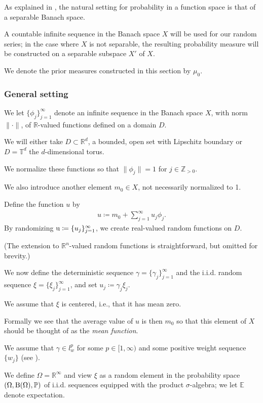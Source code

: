 \documentclass[oneside]{article}
\numberwithin{equation}{section}
\begin{document}
As explained in \cite[Sect. A.2.2]{Dashti_Stuart2017}, the natural setting for probability in a function space is that of a separable Banach space.

A countable infinite sequence in the Banach space $X$ will be used for our random series; in the case where $X$ is not separable, the resulting probability measure will be constructed on a separable subspace $X'$ of $X$.

We denote the prior measures constructed in this section by $\mu_0$.

\subsubsection{General setting}
We let $\{\phi_j\}_{j=1}^\infty$ denote an infinite sequence in the Banach space $X$, with norm $\|\cdot\|$, of $\mathbb{R}$-valued functions defined on a domain $D$.

We will either take $D\subset\mathbb{R}^d$, a bounded, open set with Lipschitz boundary or $D = \mathbb{T}^d$ the $d$-dimensional torus.

We normalize these functions so that $\|\phi_j\| = 1$ for $j\in\mathbb{Z}_{> 0}$.

We also introduce another element $m_0\in X$, not necessarily normalized to 1.

Define the function $u$ by
\begin{align}
    \label{random function}
    \tag{rand-func}
    u\coloneqq m_0 + \sum_{j=1}^\infty u_j\phi_j.
\end{align}
By randomizing ${\rm u}\coloneqq\{u_j\}_{j=1}^\infty$, we create real-valued random functions on $D$.

(The extension to $\mathbb{R}^n$-valued random functions is straightforward, but omitted for brevity.)

%
We now define the deterministic sequence $\gamma = \{\gamma_j\}_{j=1}^\infty$ and the i.i.d. random sequence $\xi = \{\xi_j\}_{j=1}^\infty$, and set $u_j\coloneqq\gamma_j\xi_j$.

We assume that $\xi$ is centered, i.e., that it has mean zero.

Formally we see that the average value of $u$ is then $m_0$ so that this element of $X$ should be thought of as the \textit{mean function}.

We assume that $\gamma\in l_w^p$ for some $p\in[1,\infty)$ and some positive weight sequence $\{w_j\}$ (see \cite[Sect. A.1.1]{Dashti_Stuart2017}).

We define $\Omega = \mathbb{R}^\infty$ and view $\xi$ as a random element in the probability space $(\Omega,{\rm B}(\Omega),\mathbb{P})$ of i.i.d. sequences equipped with the product $\sigma$-algebra; we let $\mathbb{E}$ denote expectation.
\end{document}

